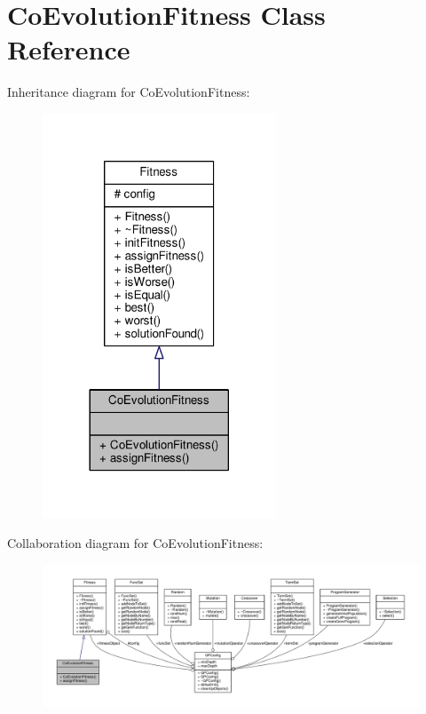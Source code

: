 \hypertarget{classCoEvolutionFitness}{}\section{Co\+Evolution\+Fitness Class Reference}
\label{classCoEvolutionFitness}


Inheritance diagram for Co\+Evolution\+Fitness\+:
\nopagebreak
\begin{figure}[H]
\begin{center}
\leavevmode
\includegraphics[width=197pt]{classCoEvolutionFitness__inherit__graph}
\end{center}
\end{figure}


Collaboration diagram for Co\+Evolution\+Fitness\+:
\nopagebreak
\begin{figure}[H]
\begin{center}
\leavevmode
\includegraphics[width=350pt]{classCoEvolutionFitness__coll__graph}
\end{center}
\end{figure}
